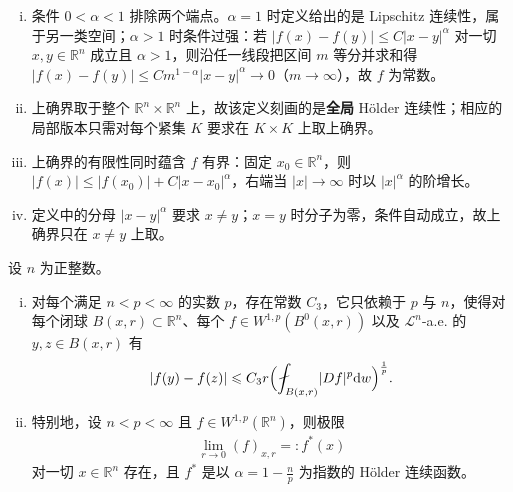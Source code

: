 \documentclass[../../main.tex]{subfiles}%
\begin{document}
\begin{remark}\label{remark:ch04-def-4-8-条件}
\begin{enumerate}[(i)]
\item 条件 $0<\alpha<1$ 排除两个端点。$\alpha=1$ 时定义给出的是 Lipschitz 连续性，属于另一类空间；$\alpha>1$ 时条件过强：若 $\lvert f(x)-f(y)\rvert\leqslant C\lvert x-y\rvert^{\alpha}$ 对一切 $x,y\in\mathbb{R}^n$ 成立且 $\alpha>1$，则沿任一线段把区间 $m$ 等分并求和得 $\lvert f(x)-f(y)\rvert\leqslant Cm^{1-\alpha}\lvert x-y\rvert^{\alpha}\to0$（$m\to\infty$），故 $f$ 为常数。
\item 上确界取于整个 $\mathbb{R}^n\times\mathbb{R}^n$ 上，故该定义刻画的是\textbf{全局} Hölder 连续性；相应的局部版本只需对每个紧集 $K$ 要求在 $K\times K$ 上取上确界。
\item 上确界的有限性同时蕴含 $f$ 有界：固定 $x_0\in\mathbb{R}^n$，则 $\lvert f(x)\rvert\leqslant\lvert f(x_0)\rvert+C\lvert x-x_0\rvert^{\alpha}$，右端当 $\lvert x\rvert\to\infty$ 时以 $\lvert x\rvert^{\alpha}$ 的阶增长。
\item 定义中的分母 $\lvert x-y\rvert^{\alpha}$ 要求 $x\neq y$；$x=y$ 时分子为零，条件自动成立，故上确界只在 $x\neq y$ 上取。
\end{enumerate}
\end{remark}

\begin{theorem}\label{theorem:ch04-4-10}
设 $n$ 为正整数。
\begin{enumerate}[(i)]
\item 对每个满足 $n<p<\infty$ 的实数 $p$，存在常数 $C_3$，它只依赖于 $p$ 与 $n$，使得对每个闭球 $B(x,r)\subset\mathbb{R}^n$、每个 $f\in W^{1,p}(B^{0}(x,r))$ 以及 $\mathcal{L}^{n}$-a.e. 的 $y,z\in B(x,r)$ 有
\begin{align*}
\lvert f(y)-f(z)\rvert\leqslant C_3r\Bigl(\fint_{B(x,r)}\lvert Df\rvert^{p}\diff w\Bigr)^{\frac{1}{p}}.
\end{align*}
\item 特别地，设 $n<p<\infty$ 且 $f\in W^{1,p}(\mathbb{R}^n)$，则极限
\begin{align*}
\lim_{r\to0}(f)_{x,r}=:f^*(x)
\end{align*}
对一切 $x\in\mathbb{R}^n$ 存在，且 $f^*$ 是以 $\alpha=1-\frac{n}{p}$ 为指数的 Hölder 连续函数。
\end{enumerate}
\end{theorem}
\end{document}
